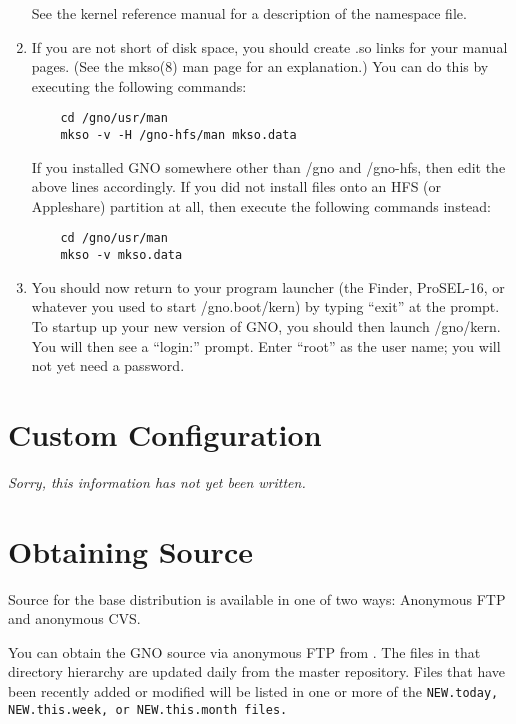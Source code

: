 \documentclass{report}
\begin{document}
\begin{enumerate}
\begin{comment}
\end{comment}	    
See the kernel reference manual for a description of the
namespace file.

\item
If you are not short of disk space, you should create .so links
for your manual pages.  (See the mkso(8) man page for an
explanation.)  You can do this by executing the following
commands:

\begin{verbatim}
	cd /gno/usr/man
	mkso -v -H /gno-hfs/man mkso.data
\end{verbatim}

If you installed GNO somewhere other than /gno and /gno-hfs, then
edit the above lines accordingly.  If you did not install files
onto an HFS (or Appleshare) partition at all, then execute the
following commands instead:

\begin{verbatim}
	cd /gno/usr/man
	mkso -v mkso.data
\end{verbatim}

\item
You should now return to your program launcher (the Finder,
ProSEL-16, or whatever you used to start /gno.boot/kern) by
typing ``exit'' at the prompt.  To startup up your new version
of GNO, you should then launch /gno/kern.  You will then see
a ``login:'' prompt.  Enter ``root'' as the user name; you will
not yet need a password.


\end{enumerate}

\section{Custom Configuration}

\it Sorry, this information has not yet been written.\rm

\section{Obtaining Source}

Source for the base distribution is available in one of two ways:
Anonymous FTP and anonymous CVS.

You can obtain the GNO source via anonymous FTP from 
.
The files in that directory hierarchy are updated daily from the
master repository.  Files that have been recently added or modified
will be listed in one or more of the 
\tt NEW.today\rm ,
\tt NEW.this.week\rm , or
\tt NEW.this.month \rm
files.
\end{document}
